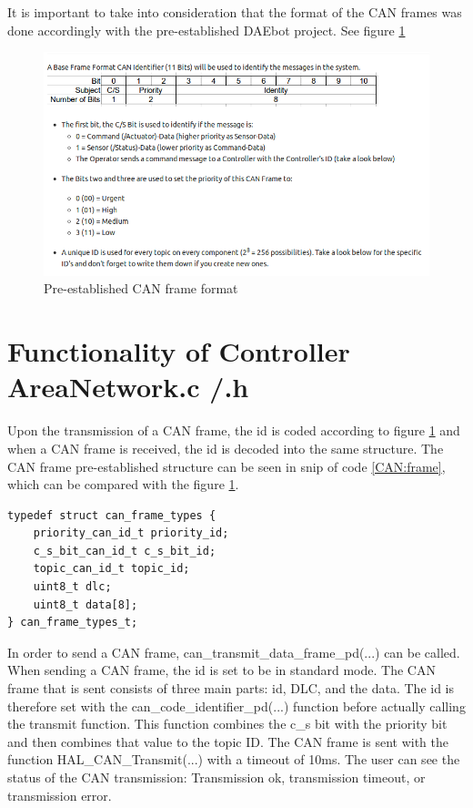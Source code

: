 \documentclass[12pt]{report}%
\begin{document}
It is important to take into consideration that the format of the CAN frames was done accordingly with the pre-established DAEbot project. See figure \ref{fig:can}

\begin{figure}[ht]
	\centering
	\includegraphics[width=\textwidth]{can_structure}
    \caption{Pre-established CAN frame format}
    \label{fig:can}
\end{figure}

\section{Functionality of Controller AreaNetwork.c /.h}

Upon the transmission of a CAN frame, the id is coded according to figure \ref{fig:can} and when a CAN frame is received, the id is decoded into the same structure. The CAN frame pre-established structure can be seen in snip of code \ref{CAN:frame}, which can be compared with the figure \ref{fig:can}.

\begin{lstlisting}[caption = CAN frame, label = CAN:frame]
typedef struct can_frame_types {
	priority_can_id_t priority_id;
	c_s_bit_can_id_t c_s_bit_id;
	topic_can_id_t topic_id;
	uint8_t dlc;
	uint8_t data[8];
} can_frame_types_t;
\end{lstlisting}
In order to send a CAN frame, can\_transmit\_data\_frame\_pd(...) can be called. When sending a CAN frame, the id is set to be in standard mode. The CAN frame that is sent consists of three main parts: id, DLC, and the data. The id is therefore set with the can\_code\_identifier\_pd(...) function before actually calling the transmit function. This function combines the c\_s bit with the priority bit and then combines that value to the topic ID. The CAN frame is sent with the function HAL\_CAN\_Transmit(...) with a timeout of 10ms. The user can see the status of the CAN transmission: Transmission ok, transmission timeout, or transmission error.
\end{document}

